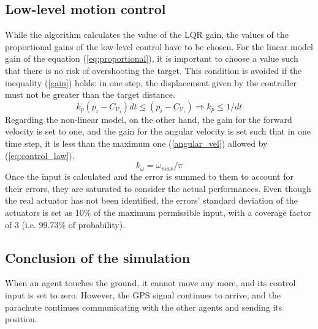 \subsection{Low-level motion control}
While the algorithm calculates the value of the LQR gain, the values of the proportional gains of the low-level control have to be chosen. For the linear model gain of the equation (\ref{eq:proportional}), it is important to choose a value such that there is no risk of overshooting the target. This condition is avoided if the inequality (\ref{gain}) holds: in one step, the displacement given by the controller must not be greater than the target distance.\\
\begin{equation}
  k_p\left(p_i - C_{\mathcal{V}_i}\right)dt \le \left(p_i - C_{\mathcal{V}_i}\right) \Rightarrow k_p \le 1/dt
  \label{gain}
\end{equation}
Regarding the non-linear model, on the other hand, the gain for the forward velocity is set to one, and the gain for the angular velocity is set such that in one time step, it is less than the maximum one (\ref{angular_vel}) allowed by (\ref{eq:control_law}).
\begin{equation}
  \label{angular_vel}
  k_{\omega} = \omega_{max}/\pi
\end{equation}
Once the input is calculated and the error is summed to them to account for their errors, they are saturated to consider the actual performances. Even though the real actuator has not been identified, the errors' standard deviation of the actuators is set as 10\% of the maximum permissible input, with a coverage factor of 3 (i.e. 99.73\% of probability).

\subsection{Conclusion of the simulation}
When an agent touches the ground, it cannot move any more, and its control input is set to zero. However, the GPS signal continues to arrive, and the parachute continues communicating with the other agents and sending its position.